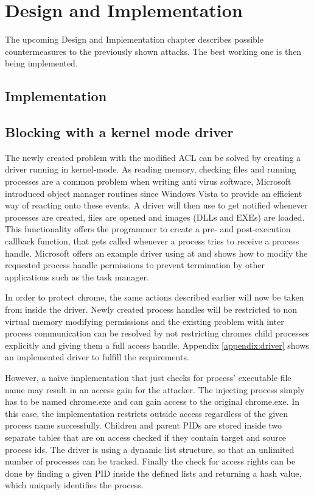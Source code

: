 \section{Design and Implementation}
The upcoming Design and Implementation chapter describes possible countermeasures to the previously shown attacks. The best working one is then being implemented.


\subsection{Implementation}
\label{sec:implementation} 

\subsection{Blocking  with a kernel mode driver}
The newly created problem with the modified \gls{ACL} can be solved by creating a driver running in kernel-mode. As reading memory, checking files and running processes are a common problem when writing anti virus software, Microsoft introduced object manager routines since Windows Vista to provide an efficient way of reacting onto these events. A driver will then use  to get notified whenever processes are created, files are opened and images (\glspl{DLL} and EXEs) are loaded. This functionality offers the programmer to create a pre- and post-execution callback function, that gets called whenever a process tries to receive a process handle. Microsoft offers an example driver using  at \cite{github_obcallback} and shows how to modify the requested process handle permissions to prevent termination by other applications such as the task manager. 

In order to protect chrome, the same actions described earlier will now be taken from inside the driver. Newly created process handles will be restricted to non virtual memory modifying permissions and the existing problem with inter process communication can be resolved by not restricting chromes child processes explicitly and giving them a full access handle. Appendix \ref{appendix:driver} shows an implemented driver to fulfill the requirements.

However, a naive implementation that just checks for process' executable file name may result in an access gain for the attacker. The injecting process simply has to be named chrome.exe and can gain access to the original chrome.exe. In this case, the implementation restricts outside access regardless of the given process name successfully. Children and parent \glspl{PID} are stored inside two separate tables that are on access checked if they contain target and source process ids. The driver is using a dynamic list structure, so that an unlimited number of processes can be tracked. Finally the check for access rights can be done by finding a given \gls{PID} inside the defined lists and returning a hash value, which uniquely identifies the process. 

